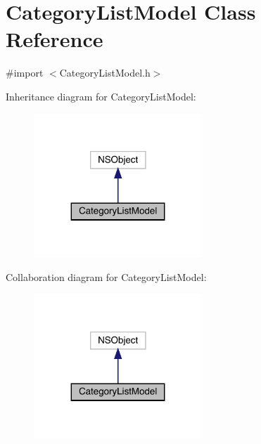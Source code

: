 \hypertarget{interface_category_list_model}{}\section{Category\+List\+Model Class Reference}
\label{interface_category_list_model}


{\ttfamily \#import $<$Category\+List\+Model.\+h$>$}



Inheritance diagram for Category\+List\+Model\+:\nopagebreak
\begin{figure}[H]
\begin{center}
\leavevmode
\includegraphics[width=179pt]{interface_category_list_model__inherit__graph}
\end{center}
\end{figure}


Collaboration diagram for Category\+List\+Model\+:\nopagebreak
\begin{figure}[H]
\begin{center}
\leavevmode
\includegraphics[width=179pt]{interface_category_list_model__coll__graph}
\end{center}
\end{figure}
